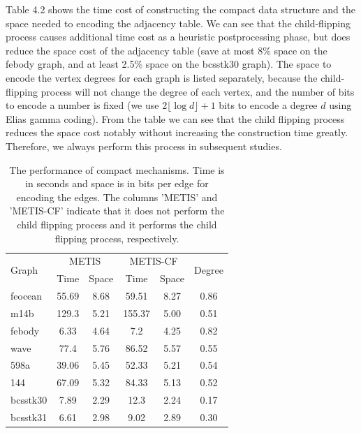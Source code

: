 \documentclass[12pt,glossary]{dalthesis}
\begin{document}
\bigskip
\bigskip


Table 4.2 shows the time cost of constructing the compact data structure and the space needed to encoding the adjacency table. We can see that the child-flipping process causes additional time cost as a heuristic postprocessing phase, but does reduce the space cost of the adjacency table (save at most 8\% space on the febody graph, and at least 2.5\% space on the bcsstk30 graph). The space to encode the vertex degrees for each graph is listed separately, because the child-flipping process will not change the degree of each vertex, and the number of bits to encode a number is fixed (we use $2\lfloor \log d \rfloor + 1$ bits to encode a degree $d$ using Elias gamma coding). From the table we can see that the child flipping process reduces the space cost notably without increasing the construction time greatly. Therefore, we always perform this process in subsequent studies. 

\begin{table}[]
\centering
\caption{The performance of compact mechanisms. Time is in seconds and space is in bits per edge for encoding the edges. The columns 'METIS' and 'METIS-CF' indicate that it does not perform the child flipping process and it performs the child flipping process, respectively.}
\label{compact-performance}
\begin{tabular}{|l||c|c||c|c||c|}
\cline{2-6}
\hline
\multirow{2}{*}{Graph} & \multicolumn{2}{c||}{METIS} & \multicolumn{2}{c||}{METIS-CF} & \multirow{2}{*}{Degree} \\ \cline{2-5}
                       & Time          & Space        & Time           & Space         &                         \\ \cline{6-6} \hline
feocean                & 55.69         & 8.68         & 59.51          & 8.27          & 0.86                    \\
m14b                   & 129.3         & 5.21         & 155.37         & 5.00          & 0.51                    \\
febody                 & 6.33          & 4.64         & 7.2            & 4.25          & 0.82                    \\
wave                   & 77.4          & 5.76         & 86.52          & 5.57          & 0.55                    \\
598a                   & 39.06         & 5.45         & 52.33          & 5.21          & 0.54                    \\
144                    & 67.09         & 5.32         & 84.33          & 5.13          & 0.52                    \\
bcsstk30               & 7.89          & 2.29         & 12.3           & 2.24          & 0.17                    \\
bcsstk31               & 6.61          & 2.98         & 9.02           & 2.89          & 0.30                    \\ \hline
\end{tabular}
\end{table}
\end{document}
